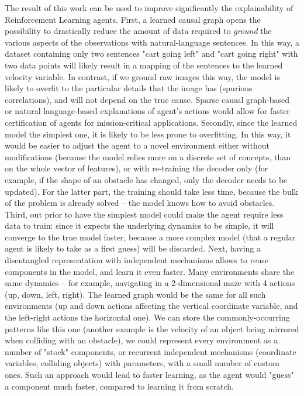 \documentclass[a4paper,11pt,oneside]{report}
\begin{document}
The result of this work can be used to improve significantly the explainability of Reinforcement Learning agents. First, a learned causal graph opens the possibility to drastically reduce the amount of data required to {\em ground} the various aspects of the observations with natural-language sentences.
In this way, a dataset containing only two sentences "cart going left" and "cart going right" with two data points will likely result in a mapping of the sentences to the learned velocity variable. In contrast, if we ground raw images this way, the model is likely to overfit to the particular details that the image has (spurious correlations), and will not depend on the true cause.
Sparse causal graph-based or natural language-based explanations of agent's actions would allow for faster certification of agents for mission-critical applications.
Secondly, since the learned model the simplest one, it is likely to be less prone to overfitting. In this way, it would be easier to adjust the agent to a novel environment either without modifications (because the model relies more on a discrete set of concepts, than on the whole vector of features), or with re-training the decoder only (for example, if the shape of an obstacle has changed, only the decoder needs to be updated). For the latter part, the training should take less time, because the bulk of the problem is already solved -- the model knows how to avoid obstacles.
Third, out prior to have the simplest model could make the agent require less data to train: since it expects the underlying dynamics to be simple, it will converge to the true model faster, because a more complex model (that a regular agent is likely to take as a first guess) will be discarded.
Next, having a disentangled representation with independent mechanisms allows to reuse components in the model, and learn it even faster. Many environments share the same dynamics -- for example, navigating in a 2-dimensional maze with 4 actions (up, down, left, right). The learned graph would be the same for all such environments (up and down actions affecting the vertical coordinate variable, and the left-right actions the horizontal one). We can store the commonly-occurring patterns like this one (another example is the velocity of an object being mirrored when colliding with an obstacle), we could represent every environment as a number of "stock" components, or recurrent independent mechanisms (coordinate variables, colliding objects) with parameters, with a small number of custom ones. Such an approach would lead to faster learning, as the agent would "guess" a component much faster, compared to learning it from scratch.
\end{document}
